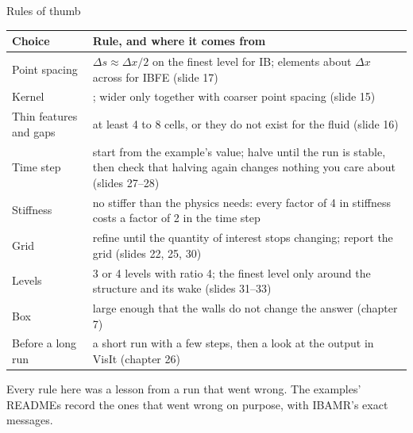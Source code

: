 \documentclass[aspectratio=169,11pt]{beamer}
\begin{document}
\begin{frame}{Rules of thumb}
\scriptsize
\begin{tabular}{@{}L{0.26\textwidth}L{0.68\textwidth}@{}}
\toprule
Choice & Rule, and where it comes from\\
\midrule
Point spacing & $\Delta s \approx \Delta x/2$ on the finest level for IB; elements about $\Delta x$ across for IBFE (slide 17)\\
Kernel & ; wider only together with coarser point spacing (slide 15)\\
Thin features and gaps & at least 4 to 8 cells, or they do not exist for the fluid (slide 16)\\
Time step & start from the example's value; halve until the run is stable, then check that halving again changes nothing you care about (slides 27--28)\\
Stiffness & no stiffer than the physics needs: every factor of 4 in stiffness costs a factor of 2 in the time step\\
Grid & refine until the quantity of interest stops changing; report the grid (slides 22, 25, 30)\\
Levels & 3 or 4 levels with ratio 4; the finest level only around the structure and its wake (slides 31--33)\\
Box & large enough that the walls do not change the answer (chapter 7)\\
Before a long run & a short run with a few steps, then a look at the output in VisIt (chapter 26)\\
\bottomrule
\end{tabular}
\vspace{2mm}
\begin{punchbox}
\small Every rule here was a lesson from a run that went wrong. The examples' READMEs record the ones that went wrong on purpose, with IBAMR's exact messages.
\end{punchbox}
\end{frame}
\end{document}
